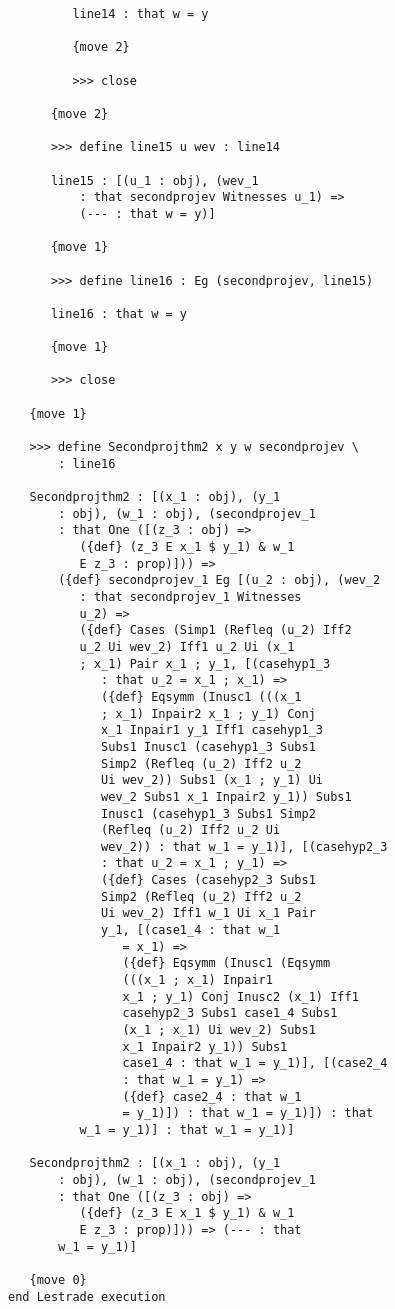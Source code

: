 \documentclass[12pt]{article}
\begin{document}
\begin{verbatim}
         line14 : that w = y

         {move 2}

         >>> close

      {move 2}

      >>> define line15 u wev : line14

      line15 : [(u_1 : obj), (wev_1 
          : that secondprojev Witnesses u_1) => 
          (--- : that w = y)]

      {move 1}

      >>> define line16 : Eg (secondprojev, line15)

      line16 : that w = y

      {move 1}

      >>> close

   {move 1}

   >>> define Secondprojthm2 x y w secondprojev \
       : line16

   Secondprojthm2 : [(x_1 : obj), (y_1 
       : obj), (w_1 : obj), (secondprojev_1 
       : that One ([(z_3 : obj) => 
          ({def} (z_3 E x_1 $ y_1) & w_1 
          E z_3 : prop)])) => 
       ({def} secondprojev_1 Eg [(u_2 : obj), (wev_2 
          : that secondprojev_1 Witnesses 
          u_2) => 
          ({def} Cases (Simp1 (Refleq (u_2) Iff2 
          u_2 Ui wev_2) Iff1 u_2 Ui (x_1 
          ; x_1) Pair x_1 ; y_1, [(casehyp1_3 
             : that u_2 = x_1 ; x_1) => 
             ({def} Eqsymm (Inusc1 (((x_1 
             ; x_1) Inpair2 x_1 ; y_1) Conj 
             x_1 Inpair1 y_1 Iff1 casehyp1_3 
             Subs1 Inusc1 (casehyp1_3 Subs1 
             Simp2 (Refleq (u_2) Iff2 u_2 
             Ui wev_2)) Subs1 (x_1 ; y_1) Ui 
             wev_2 Subs1 x_1 Inpair2 y_1)) Subs1 
             Inusc1 (casehyp1_3 Subs1 Simp2 
             (Refleq (u_2) Iff2 u_2 Ui 
             wev_2)) : that w_1 = y_1)], [(casehyp2_3 
             : that u_2 = x_1 ; y_1) => 
             ({def} Cases (casehyp2_3 Subs1 
             Simp2 (Refleq (u_2) Iff2 u_2 
             Ui wev_2) Iff1 w_1 Ui x_1 Pair 
             y_1, [(case1_4 : that w_1 
                = x_1) => 
                ({def} Eqsymm (Inusc1 (Eqsymm 
                (((x_1 ; x_1) Inpair1 
                x_1 ; y_1) Conj Inusc2 (x_1) Iff1 
                casehyp2_3 Subs1 case1_4 Subs1 
                (x_1 ; x_1) Ui wev_2) Subs1 
                x_1 Inpair2 y_1)) Subs1 
                case1_4 : that w_1 = y_1)], [(case2_4 
                : that w_1 = y_1) => 
                ({def} case2_4 : that w_1 
                = y_1)]) : that w_1 = y_1)]) : that 
          w_1 = y_1)] : that w_1 = y_1)]

   Secondprojthm2 : [(x_1 : obj), (y_1 
       : obj), (w_1 : obj), (secondprojev_1 
       : that One ([(z_3 : obj) => 
          ({def} (z_3 E x_1 $ y_1) & w_1 
          E z_3 : prop)])) => (--- : that 
       w_1 = y_1)]

   {move 0}
end Lestrade execution
\end{verbatim}
\end{document}
